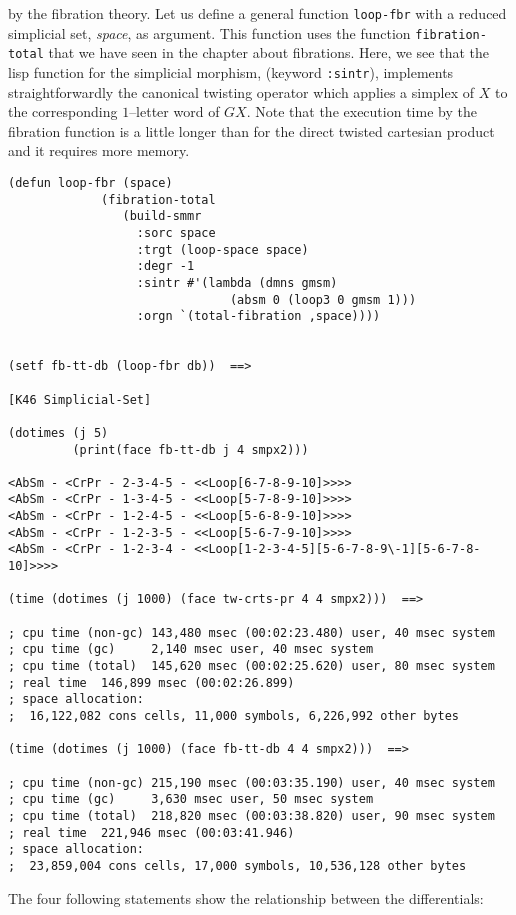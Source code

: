 by the fibration theory.
Let us define a general function {\tt loop-fbr} with  a reduced simplicial set,
{\em space}, as argument. This function uses the function {\tt fibration-total}
that we have seen in the  chapter about fibrations.
Here, we see that the lisp function for the simplicial morphism, (keyword {\tt :sintr}),
implements straightforwardly the canonical twisting operator which applies a simplex of $X$
to the corresponding $1$--letter word of $GX$. Note that the execution time by
the fibration function is a little longer than for the direct twisted cartesian product
and it requires more memory.
{\footnotesize\begin{verbatim}
(defun loop-fbr (space)
             (fibration-total
                (build-smmr
                  :sorc space
                  :trgt (loop-space space)
                  :degr -1
                  :sintr #'(lambda (dmns gmsm)
                               (absm 0 (loop3 0 gmsm 1)))
                  :orgn `(total-fibration ,space))))


(setf fb-tt-db (loop-fbr db))  ==>

[K46 Simplicial-Set]

(dotimes (j 5)
         (print(face fb-tt-db j 4 smpx2)))

<AbSm - <CrPr - 2-3-4-5 - <<Loop[6-7-8-9-10]>>>>
<AbSm - <CrPr - 1-3-4-5 - <<Loop[5-7-8-9-10]>>>>
<AbSm - <CrPr - 1-2-4-5 - <<Loop[5-6-8-9-10]>>>>
<AbSm - <CrPr - 1-2-3-5 - <<Loop[5-6-7-9-10]>>>>
<AbSm - <CrPr - 1-2-3-4 - <<Loop[1-2-3-4-5][5-6-7-8-9\-1][5-6-7-8-10]>>>>

(time (dotimes (j 1000) (face tw-crts-pr 4 4 smpx2)))  ==>

; cpu time (non-gc) 143,480 msec (00:02:23.480) user, 40 msec system
; cpu time (gc)     2,140 msec user, 40 msec system
; cpu time (total)  145,620 msec (00:02:25.620) user, 80 msec system
; real time  146,899 msec (00:02:26.899)
; space allocation:
;  16,122,082 cons cells, 11,000 symbols, 6,226,992 other bytes

(time (dotimes (j 1000) (face fb-tt-db 4 4 smpx2)))  ==>

; cpu time (non-gc) 215,190 msec (00:03:35.190) user, 40 msec system
; cpu time (gc)     3,630 msec user, 50 msec system
; cpu time (total)  218,820 msec (00:03:38.820) user, 90 msec system
; real time  221,946 msec (00:03:41.946)
; space allocation:
;  23,859,004 cons cells, 17,000 symbols, 10,536,128 other bytes
\end{verbatim}}
The four following statements show the relationship
between the differentials:
